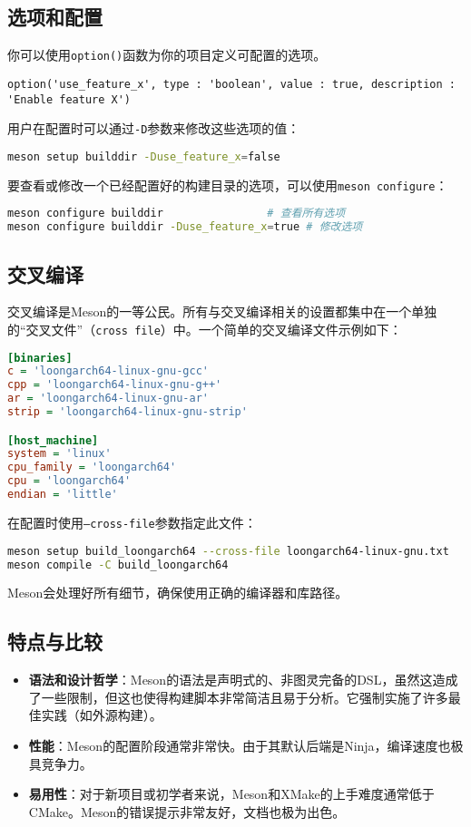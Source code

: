 \documentclass[../main.tex]{subfiles}
\begin{document}
\subsection{选项和配置}
你可以使用\texttt{option()}函数为你的项目定义可配置的选项。
\begin{lstlisting}
option('use_feature_x', type : 'boolean', value : true, description : 'Enable feature X')
\end{lstlisting}
用户在配置时可以通过\texttt{-D}参数来修改这些选项的值：
\begin{lstlisting}[language=bash]
meson setup builddir -Duse_feature_x=false
\end{lstlisting}
要查看或修改一个已经配置好的构建目录的选项，可以使用\texttt{meson configure}：
\begin{lstlisting}[language=bash]
meson configure builddir                # 查看所有选项
meson configure builddir -Duse_feature_x=true # 修改选项
\end{lstlisting}

\subsection{交叉编译}
交叉编译是Meson的一等公民。所有与交叉编译相关的设置都集中在一个单独的“交叉文件”（\texttt{cross file}）中。一个简单的交叉编译文件示例如下：
\begin{lstlisting}[language=ini]
[binaries]
c = 'loongarch64-linux-gnu-gcc'
cpp = 'loongarch64-linux-gnu-g++'
ar = 'loongarch64-linux-gnu-ar'
strip = 'loongarch64-linux-gnu-strip'

[host_machine]
system = 'linux'
cpu_family = 'loongarch64'
cpu = 'loongarch64'
endian = 'little'
\end{lstlisting}

在配置时使用\texttt{--cross-file}参数指定此文件：
\begin{lstlisting}[language=bash]
meson setup build_loongarch64 --cross-file loongarch64-linux-gnu.txt
meson compile -C build_loongarch64
\end{lstlisting}
Meson会处理好所有细节，确保使用正确的编译器和库路径。

\subsection{特点与比较}
\begin{itemize}
    \item \textbf{语法和设计哲学}：Meson的语法是声明式的、非图灵完备的DSL，虽然这造成了一些限制，但这也使得构建脚本非常简洁且易于分析。它强制实施了许多最佳实践（如外源构建）。
    \item \textbf{性能}：Meson的配置阶段通常非常快。由于其默认后端是Ninja，编译速度也极具竞争力。
    \item \textbf{易用性}：对于新项目或初学者来说，Meson和XMake的上手难度通常低于CMake。Meson的错误提示非常友好，文档也极为出色。
\end{itemize}
\end{document}
